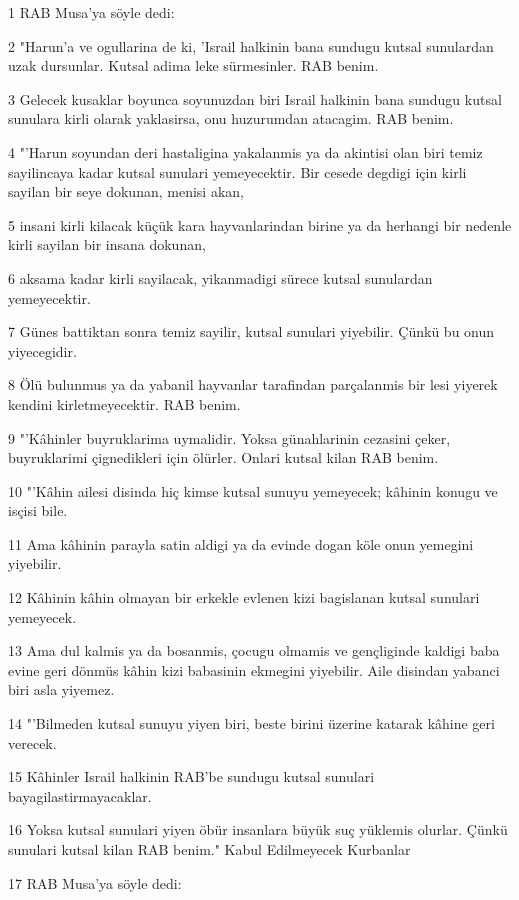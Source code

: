 \par 1 RAB Musa'ya söyle dedi:
\par 2 "Harun'a ve ogullarina de ki, 'Israil halkinin bana sundugu kutsal sunulardan uzak dursunlar. Kutsal adima leke sürmesinler. RAB benim.
\par 3 Gelecek kusaklar boyunca soyunuzdan biri Israil halkinin bana sundugu kutsal sunulara kirli olarak yaklasirsa, onu huzurumdan atacagim. RAB benim.
\par 4 "'Harun soyundan deri hastaligina yakalanmis ya da akintisi olan biri temiz sayilincaya kadar kutsal sunulari yemeyecektir. Bir cesede degdigi için kirli sayilan bir seye dokunan, menisi akan,
\par 5 insani kirli kilacak küçük kara hayvanlarindan birine ya da herhangi bir nedenle kirli sayilan bir insana dokunan,
\par 6 aksama kadar kirli sayilacak, yikanmadigi sürece kutsal sunulardan yemeyecektir.
\par 7 Günes battiktan sonra temiz sayilir, kutsal sunulari yiyebilir. Çünkü bu onun yiyecegidir.
\par 8 Ölü bulunmus ya da yabanil hayvanlar tarafindan parçalanmis bir lesi yiyerek kendini kirletmeyecektir. RAB benim.
\par 9 "'Kâhinler buyruklarima uymalidir. Yoksa günahlarinin cezasini çeker, buyruklarimi çignedikleri için ölürler. Onlari kutsal kilan RAB benim.
\par 10 "'Kâhin ailesi disinda hiç kimse kutsal sunuyu yemeyecek; kâhinin konugu ve isçisi bile.
\par 11 Ama kâhinin parayla satin aldigi ya da evinde dogan köle onun yemegini yiyebilir.
\par 12 Kâhinin kâhin olmayan bir erkekle evlenen kizi bagislanan kutsal sunulari yemeyecek.
\par 13 Ama dul kalmis ya da bosanmis, çocugu olmamis ve gençliginde kaldigi baba evine geri dönmüs kâhin kizi babasinin ekmegini yiyebilir. Aile disindan yabanci biri asla yiyemez.
\par 14 "'Bilmeden kutsal sunuyu yiyen biri, beste birini üzerine katarak kâhine geri verecek.
\par 15 Kâhinler Israil halkinin RAB'be sundugu kutsal sunulari bayagilastirmayacaklar.
\par 16 Yoksa kutsal sunulari yiyen öbür insanlara büyük suç yüklemis olurlar. Çünkü sunulari kutsal kilan RAB benim." Kabul Edilmeyecek Kurbanlar
\par 17 RAB Musa'ya söyle dedi:
